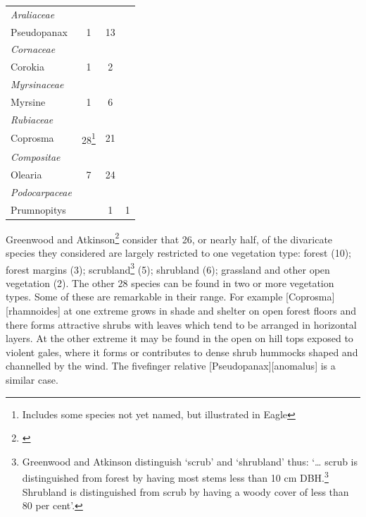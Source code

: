 \begin{xltabular}{\textwidth}{ X c c c }
	\emph{Araliaceae} \\
	\hspace{3mm}Pseudopanax & 1 & 13 \\
	\emph{Cornaceae} \\
	\hspace{3mm}Corokia & 1 & 2 \\
	\emph{Myrsinaceae} \\
	\hspace{3mm}Myrsine & 1 & 6 \\
	\emph{Rubiaceae} \\
	\hspace{3mm}Coprosma
	& 28\footnote{Includes some species not yet named, but illustrated in Eagle}
	& 21 \\
	\emph{Compositae} \\
	\hspace{3mm}Olearia & 7 & 24 \\
	\emph{Podocarpaceae} \\
	\hspace{3mm}Prumnopitys &  & 1 & 1 \\
	\bottomrule
\end{xltabular}

Greenwood and Atkinson\footnote{\cite{greenwood1977evolution}} consider that 26, or nearly half, of the divaricate species they considered are largely restricted to one vegetation type: forest (10); forest margins (3); scrubland\footnote{Greenwood and Atkinson distinguish `scrub' and `shrubland' thus: `… scrub is distinguished from forest by having most stems less than 10 cm DBH.\footnote{DBH:\@Diameter at breast height, typically 1.3m above ground.} Shrubland is distinguished from scrub by having a woody cover of less than 80 per cent'.} (5); shrubland (6); grassland and other open vegetation (2).
The other 28 species can be found in two or more vegetation types.
Some of these are remarkable in their range.
For example [Coprosma][rhamnoides] at one extreme grows in shade and shelter on open forest floors and there forms attractive shrubs with leaves which tend to be arranged in horizontal layers.
At the other extreme it may be found in the open on hill tops exposed to violent gales, where it forms or contributes to dense shrub hummocks shaped and channelled by the wind.
The fivefinger relative [Pseudopanax][anomalus] is a similar case.

